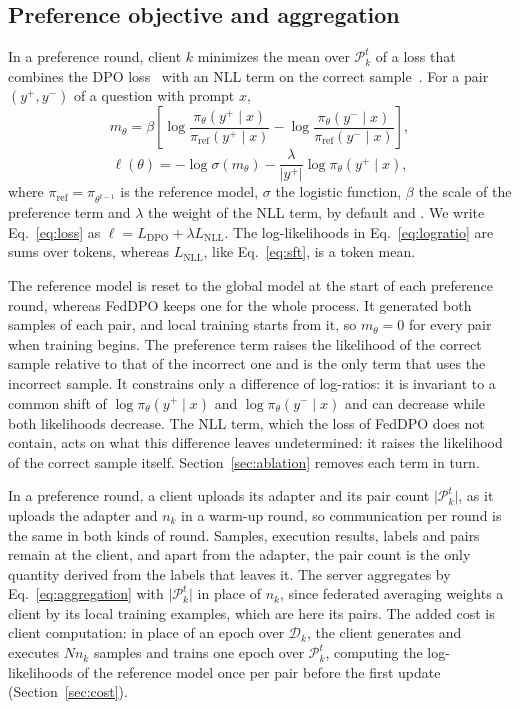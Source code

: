 \subsection{Preference objective and aggregation}\label{sec:objective}

In a preference round, client $k$ minimizes the mean over
$\mathcal{P}_k^{t}$ of a loss that combines the DPO
loss~\cite{rafailov2023dpo} with an NLL term on the correct
sample~\cite{pang2024irpo,tao2024codelutra}. For a pair
$(y^{+}, y^{-})$ of a question with prompt $x$,
\begin{equation}
  m_\theta = \beta \left[
    \log \frac{\pi_\theta(y^{+} \mid x)}{\pi_{\mathrm{ref}}(y^{+} \mid x)}
    - \log \frac{\pi_\theta(y^{-} \mid x)}{\pi_{\mathrm{ref}}(y^{-} \mid x)}
  \right],
  \label{eq:logratio}
\end{equation}
\begin{equation}
  \ell(\theta) = -\log \sigma(m_\theta)
    - \frac{\lambda}{\lvert y^{+} \rvert} \log \pi_\theta(y^{+} \mid x),
  \label{eq:loss}
\end{equation}
where $\pi_{\mathrm{ref}} = \pi_{\theta^{t-1}}$ is the reference model,
$\sigma$ the logistic function, $\beta$ the scale of the preference term
and $\lambda$ the weight of the NLL term, by default 
and . We write Eq.~\eqref{eq:loss} as
$\ell = L_{\mathrm{DPO}} + \lambda L_{\mathrm{NLL}}$. The
log-likelihoods in Eq.~\eqref{eq:logratio} are sums over tokens, whereas
$L_{\mathrm{NLL}}$, like Eq.~\eqref{eq:sft}, is a token mean.

The reference model is reset to the global model at the start of each
preference round, whereas FedDPO keeps one for the whole process. It
generated both samples of each pair, and local training starts from it,
so $m_\theta = 0$ for every pair when training begins. The preference
term raises the likelihood of the correct sample relative to that of the
incorrect one and is the only term that uses the incorrect sample. It
constrains only a difference of log-ratios: it is invariant to a common
shift of $\log \pi_\theta(y^{+} \mid x)$ and
$\log \pi_\theta(y^{-} \mid x)$ and can decrease while both likelihoods
decrease. The NLL term, which the loss of FedDPO does not contain, acts
on what this difference leaves undetermined: it raises the likelihood of
the correct sample itself. Section~\ref{sec:ablation} removes each term
in turn.

In a preference round, a client uploads its adapter and its pair count $\lvert\mathcal{P}_k^{t}\rvert$,
as it uploads the adapter and $n_k$ in a warm-up round, so communication
per round is the same in both kinds of round. Samples, execution
results, labels and pairs remain at the client, and apart from the
adapter, the pair count is the only quantity derived from the labels
that leaves it. The server aggregates by Eq.~\eqref{eq:aggregation} with
$\lvert\mathcal{P}_k^{t}\rvert$ in place of $n_k$, since federated
averaging weights a client by its local training examples, which are
here its pairs. The added cost is client computation: in place of an
epoch over $\mathcal{D}_k$, the client generates and executes $N n_k$
samples and trains one epoch over $\mathcal{P}_k^{t}$, computing the
log-likelihoods of the reference model once per pair before the first
update (Section~\ref{sec:cost}).

